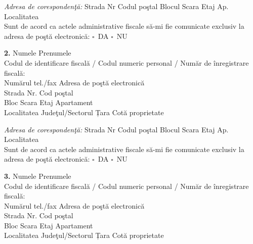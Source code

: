 \documentclass[10pt,a4paper]{article}
\newcommand{\fillline}[1][6cm]{\underline{\hspace{#1}}}
\newcommand{\checkboxempty}{$\square$}
\begin{document}
\vspace{0.2cm}
\textit{Adresa de corespondenţă:} Strada \fillline[5cm] Nr \fillline[1cm] Codul poştal \fillline[2cm] Blocul \fillline[1cm] Scara \fillline[1cm] Etaj \fillline[1cm] Ap. \fillline[1cm] Localitatea \fillline[3cm]\\
Sunt de acord ca actele administrative fiscale să-mi fie comunicate exclusiv la adresa de poştă electronică: \checkboxempty\ DA \quad \checkboxempty\ NU

\vspace{0.3cm}

\textbf{2.} Numele \fillline[6cm] Prenumele \fillline[6cm]\\
Codul de identificare fiscală / Codul numeric personal / Număr de înregistrare fiscală: \fillline[6cm]\\
Numărul tel./fax \fillline[3cm] Adresa de poştă electronică \fillline[5cm]\\
Strada \fillline[5cm] Nr. \fillline[1.5cm] Cod poştal \fillline[2cm]\\
Bloc \fillline[1cm] Scara \fillline[1cm] Etaj \fillline[1cm] Apartament \fillline[1.5cm]\\
Localitatea \fillline[4cm] Judeţul/Sectorul \fillline[3cm] Țara \fillline[2cm] Cotă proprietate \fillline[2cm]

\vspace{0.2cm}
\textit{Adresa de corespondenţă:} Strada \fillline[5cm] Nr \fillline[1cm] Codul poştal \fillline[2cm] Blocul \fillline[1cm] Scara \fillline[1cm] Etaj \fillline[1cm] Ap. \fillline[1cm] Localitatea \fillline[3cm]\\
Sunt de acord ca actele administrative fiscale să-mi fie comunicate exclusiv la adresa de poştă electronică: \checkboxempty\ DA \quad \checkboxempty\ NU

\vspace{0.3cm}

\textbf{3.} Numele \fillline[6cm] Prenumele \fillline[6cm]\\
Codul de identificare fiscală / Codul numeric personal / Număr de înregistrare fiscală: \fillline[6cm]\\
Numărul tel./fax \fillline[3cm] Adresa de poştă electronică \fillline[5cm]\\
Strada \fillline[5cm] Nr. \fillline[1.5cm] Cod poştal \fillline[2cm]\\
Bloc \fillline[1cm] Scara \fillline[1cm] Etaj \fillline[1cm] Apartament \fillline[1.5cm]\\
Localitatea \fillline[4cm] Judeţul/Sectorul \fillline[3cm] Țara \fillline[2cm] Cotă proprietate \fillline[2cm]
\end{document}
